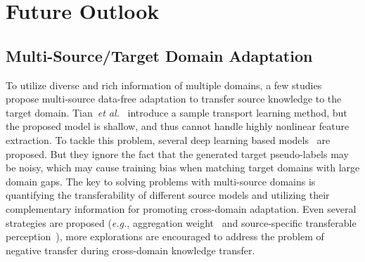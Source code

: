 \documentclass[10pt,journal,compsoc]{IEEEtran}
\def\etal{{\em et al.}}
\def\eg{{\em e.g.}}
\begin{document}
    
\section{Future Outlook}\label{sec_challenge_futurework}
\subsection{Multi-Source/Target Domain Adaptation}
To utilize diverse and rich information of multiple domains, a few studies~\cite{tian2021source, ahmed2021unsupervised, dong2021confident, shen2022benefits, han2022privacy} propose multi-source data-free adaptation to transfer source knowledge to the target domain.
Tian~\etal~\cite{tian2021source} introduce a sample transport learning method, but the proposed model is shallow, and thus cannot handle highly nonlinear feature extraction.
To tackle this problem, several deep learning based models~\cite{ahmed2021unsupervised, dong2021confident} are proposed. 
But they ignore the fact that the generated target pseudo-labels may be noisy, which may cause training bias when matching target domains with large domain gaps. 
The key to solving problems with multi-source domains is quantifying the transferability of different source models and utilizing their complementary information for promoting cross-domain adaptation.
Even several strategies are proposed (\eg, aggregation weight~\cite{ahmed2021unsupervised} and source-specific transferable perception~\cite{dong2021confident}), more explorations are encouraged to address the problem of negative transfer during cross-domain knowledge transfer. 
\end{document}
